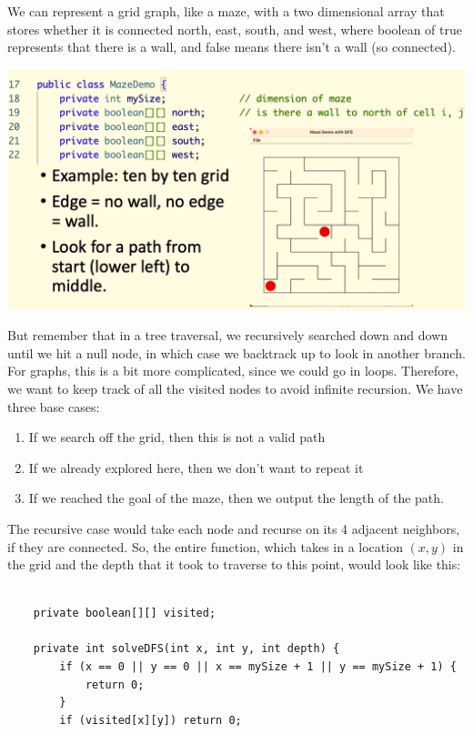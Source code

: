   \begin{example}
    We can represent a grid graph, like a maze, with a two dimensional array that stores whether it is connected north, east, south, and west, where boolean of true represents that there is a wall, and false means there isn't a wall (so connected). 
    \begin{center}
      \includegraphics[scale=0.3]{img/grid_graph.png}
    \end{center}
    But remember that in a tree traversal, we recursively searched down and down until we hit a null node, in which case we backtrack up to look in another branch. For graphs, this is a bit more complicated, since we could go in loops. Therefore, we want to keep track of all the visited nodes to avoid infinite recursion. We have three base cases: 
    \begin{enumerate}
        \item If we search off the grid, then this is not a valid path 
        \item If we already explored here, then we don't want to repeat it 
        \item If we reached the goal of the maze, then we output the length of the path. 
    \end{enumerate}
    The recursive case would take each node and recurse on its 4 adjacent neighbors, if they are connected. So, the entire function, which takes in a location $(x, y)$ in the grid and the depth that it took to traverse to this point, would look like this: 
    \begin{lstlisting}

    private boolean[][] visited; 

    private int solveDFS(int x, int y, int depth) {
        if (x == 0 || y == 0 || x == mySize + 1 || y == mySize + 1) {
            return 0; 
        }
        if (visited[x][y]) return 0; 
        

\end{lstlisting}
\end{example}
